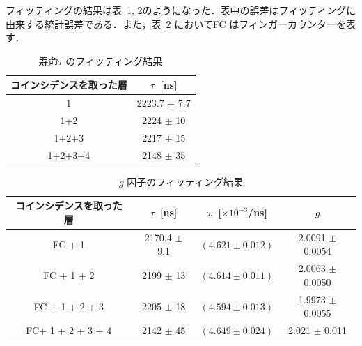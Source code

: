 フィッティングの結果は表~\ref{fit_lt}, \ref{fit_g}のようになった．表中の誤差はフィッティングに由来する統計誤差である．また，表~\ref{fit_g} においてFC はフィンガーカウンターを表す．
  
\begin{table}[H]
\caption{寿命$\tau$ のフィッティング結果}
\label{fit_lt}
\centering
\begin{tabular}{cc}\toprule
コインシデンスを取った層& $\tau$~[ns] \\ \midrule
1 & 2223.7 $\pm$ 7.7 \\
1+2 & 2224 $\pm$ 10 \\
1+2+3 & 2217 $\pm$ 15 \\
1+2+3+4 & 2148 $\pm$ 35\\ \bottomrule
\end{tabular}
\end{table}%
  
\begin{table}[H]
\caption{$g$ 因子のフィッティング結果}
\label{fit_g}
\centering
\begin{tabular}{cccc}\toprule
コインシデンスを取った層 & $\tau$~[ns] & $\omega$~[$\times 10^{-3}$/ns] & $g$ \\ \midrule
FC + 1 & 2170.4 $\pm$ 9.1 & $ (4.621 \pm 0.012) $ & 2.0091 $\pm$ 0.0054 \\
FC + 1 + 2 & 2199 $\pm$ 13 & $ (4.614 \pm 0.011) $ & 2.0063 $\pm$ 0.0050 \\
FC + 1 + 2 + 3 & 2205 $\pm$ 18 & $ (4.594 \pm 0.013) $ & 1.9973 $\pm$ 0.0055\\
FC+ 1 + 2 + 3 + 4 & 2142 $\pm$ 45 & $ (4.649 \pm 0.024) $ & 2.021 $\pm$ 0.011 \\ \bottomrule
\end{tabular}
\end{table}%


